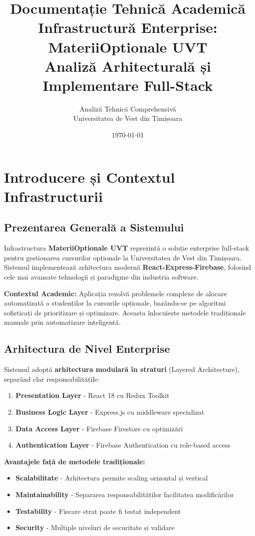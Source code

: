 \documentclass[11pt,a4paper]{article}
\title{\textbf{Documentație Tehnică Academică\\Infrastructură Enterprise: MateriiOptionale UVT\\Analiză Arhitecturală și Implementare Full-Stack}}
\author{Analiză Tehnică Comprehensivă\\Universitatea de Vest din Timișoara}
\date{\today}
\begin{document}
\maketitle

\tableofcontents
\newpage

\section{Introducere și Contextul Infrastructurii}

\subsection{Prezentarea Generală a Sistemului}

Infrastructura \textbf{MateriiOptionale UVT} reprezintă o soluție enterprise full-stack pentru gestionarea cursurilor opționale la Universitatea de Vest din Timișoara. Sistemul implementează arhitectura modernă \textbf{React-Express-Firebase}, folosind cele mai avansate tehnologii și paradigme din industria software.

\textbf{Contextul Academic:} Aplicația rezolvă problemele complexe de alocare automatizată a studenților la cursurile opționale, bazându-se pe algoritmi sofisticați de prioritizare și optimizare. Aceasta înlocuiește metodele tradiționale manuale prin automatizare inteligentă.

\subsection{Arhitectura de Nivel Enterprise}

Sistemul adoptă \textbf{arhitectura modulară în straturi} (Layered Architecture), separând clar responsabilitățile:

\begin{enumerate}
    \item \textbf{Presentation Layer} - React 18 cu Redux Toolkit
    \item \textbf{Business Logic Layer} - Express.js cu middleware specializat
    \item \textbf{Data Access Layer} - Firebase Firestore cu optimizări
    \item \textbf{Authentication Layer} - Firebase Authentication cu role-based access
\end{enumerate}

\textbf{Avantajele față de metodele tradiționale:}
\begin{itemize}
    \item \textbf{Scalabilitate} - Arhitectura permite scaling orizontal și vertical
    \item \textbf{Maintainability} - Separarea responsabilităților facilitatea modificărilor
    \item \textbf{Testability} - Fiecare strat poate fi testat independent
    \item \textbf{Security} - Multiple niveluri de securitate și validare
\end{itemize}
\end{document}
